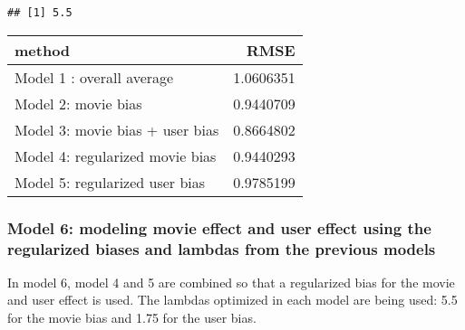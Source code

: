 \documentclass[
]{article}
\newenvironment{Shaded}{\begin{snugshade}}{\end{snugshade}}
\newcommand{\DataTypeTok}[1]{\textcolor[rgb]{0.13,0.29,0.53}{#1}}
\newcommand{\KeywordTok}[1]{\textcolor[rgb]{0.13,0.29,0.53}{\textbf{#1}}}
\newcommand{\NormalTok}[1]{#1}
\newcommand{\OperatorTok}[1]{\textcolor[rgb]{0.81,0.36,0.00}{\textbf{#1}}}
\newcommand{\StringTok}[1]{\textcolor[rgb]{0.31,0.60,0.02}{#1}}
\begin{document}
\begin{verbatim}
## [1] 5.5
\end{verbatim}

\begin{Shaded}
\end{Shaded}

\begin{longtable}[]{@{}lr@{}}
\toprule
method & RMSE\tabularnewline
\midrule
\endhead
Model 1 : overall average & 1.0606351\tabularnewline
Model 2: movie bias & 0.9440709\tabularnewline
Model 3: movie bias + user bias & 0.8664802\tabularnewline
Model 4: regularized movie bias & 0.9440293\tabularnewline
Model 5: regularized user bias & 0.9785199\tabularnewline
\bottomrule
\end{longtable}

\hypertarget{model-6-modeling-movie-effect-and-user-effect-using-the-regularized-biases-and-lambdas-from-the-previous-models}{%
\subsubsection{Model 6: modeling movie effect and user effect using the
regularized biases and lambdas from the previous
models}\label{model-6-modeling-movie-effect-and-user-effect-using-the-regularized-biases-and-lambdas-from-the-previous-models}}

In model 6, model 4 and 5 are combined so that a regularized bias for
the movie and user effect is used. The lambdas optimized in each model
are being used: 5.5 for the movie bias and 1.75 for the user bias.
\end{document}
